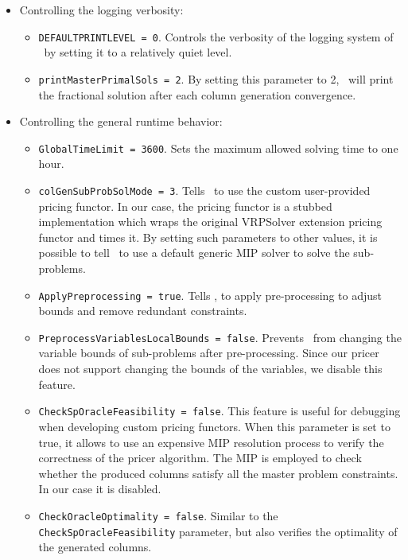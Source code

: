\begin{itemize}
	\item Controlling the logging verbosity:
	      \begin{itemize}
		      \item \texttt{DEFAULTPRINTLEVEL = 0}.
		            Controls the verbosity of the logging system of \bapcod\ by setting it to a relatively quiet level.
		      \item \texttt{printMasterPrimalSols = 2}.
		            By setting this parameter to 2, \bapcod\ will print the fractional solution after each column generation convergence.
	      \end{itemize}

	\item Controlling the general runtime behavior:
	      \begin{itemize}
		      \item \texttt{GlobalTimeLimit = 3600}. Sets the maximum allowed solving time to one hour.
		      \item \texttt{colGenSubProbSolMode = 3}. Tells \bapcod\ to use the custom user-provided pricing functor.
		            In our case, the pricing functor is a stubbed implementation which wraps the original VRPSolver extension pricing functor
		            and times it.
		            By setting such parameters to other values, it is possible to tell \bapcod\ to use a default generic MIP solver to solve the sub-problems.
		      \item \texttt{ApplyPreprocessing = true}. Tells \bapcod, to apply pre-processing to adjust bounds and remove redundant constraints.
		      \item \texttt{PreprocessVariablesLocalBounds = false}.
		            Prevents \bapcod\ from changing the variable bounds of sub-problems after pre-processing.
		            Since our pricer does not support changing the bounds of the variables,
		            we disable this feature.
		      \item \texttt{CheckSpOracleFeasibility = false}.
		            This feature is useful for debugging when developing custom pricing functors.
		            When this parameter is set to true, it allows to use an expensive MIP resolution process
		            to verify the correctness of the pricer algorithm.
		            The MIP is employed to check whether the produced columns satisfy all the master problem constraints.
		            In our case it is disabled.
		      \item \texttt{CheckOracleOptimality = false}.
		            Similar to the \texttt{CheckSpOracleFeasibility} parameter, but also verifies the optimality of the generated columns.
	      \end{itemize}
\end{itemize}

